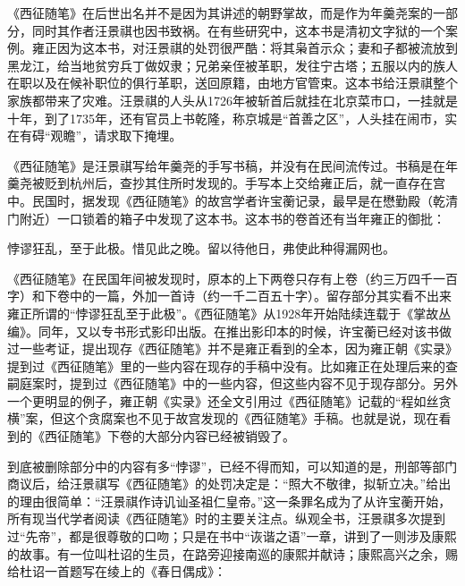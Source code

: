 
《西征随笔》在后世出名并不是因为其讲述的朝野掌故，而是作为年羹尧案的一部分，同时其作者汪景祺也因书致祸。在有些研究中，这本书是清初文字狱的一个案例。雍正因为这本书，对汪景祺的处罚很严酷：将其枭首示众；妻和子都被流放到黑龙江，给当地贫穷兵丁做奴隶；兄弟亲侄被革职，发往宁古塔；五服以内的族人在职以及在候补职位的俱行革职，送回原籍，由地方官管束。这本书给汪景祺整个家族都带来了灾难。汪景祺的人头从1726年被斩首后就挂在北京菜市口，一挂就是十年，到了1735年，还有官员上书乾隆，称京城是“首善之区”，人头挂在闹市，实在有碍“观瞻”，请求取下掩埋。



《西征随笔》是汪景祺写给年羹尧的手写书稿，并没有在民间流传过。书稿是在年羹尧被贬到杭州后，查抄其住所时发现的。手写本上交给雍正后，就一直存在宫中。民国时，据发现《西征随笔》的故宫学者许宝蘅记录，最早是在懋勤殿（乾清门附近）一口锁着的箱子中发现了这本书。这本书的卷首还有当年雍正的御批：



\begin{bookquote}悖谬狂乱，至于此极。惜见此之晚。留以待他日，弗使此种得漏网也。\end{bookquote}


《西征随笔》在民国年间被发现时，原本的上下两卷只存有上卷（约三万四千一百字）和下卷中的一篇，外加一首诗（约一千二百五十字）。留存部分其实看不出来雍正所谓的“悖谬狂乱至于此极”。《西征随笔》从1928年开始陆续连载于《掌故丛编》。同年，又以专书形式影印出版。在推出影印本的时候，许宝蘅已经对该书做过一些考证，提出现存《西征随笔》并不是雍正看到的全本，因为雍正朝《实录》提到过《西征随笔》里的一些内容在现存的手稿中没有。比如雍正在处理后来的查嗣庭案时，提到过《西征随笔》中的一些内容，但这些内容不见于现存部分。另外一个更明显的例子，雍正朝《实录》还全文引用过《西征随笔》记载的“程如丝贪横”案，但这个贪腐案也不见于故宫发现的《西征随笔》手稿。也就是说，现在看到的《西征随笔》下卷的大部分内容已经被销毁了。



到底被删除部分中的内容有多“悖谬”，已经不得而知，可以知道的是，刑部等部门商议后，给汪景祺写《西征随笔》的处罚决定是：“照大不敬律，拟斩立决。”给出的理由很简单：“汪景祺作诗讥讪圣祖仁皇帝。”这一条罪名成为了从许宝蘅开始，所有现当代学者阅读《西征随笔》时的主要关注点。纵观全书，汪景祺多次提到过“先帝”，都是很尊敬的口吻；只是在书中“诙谐之语”一章，讲到了一则涉及康熙的故事。有一位叫杜诏的生员，在路旁迎接南巡的康熙并献诗；康熙高兴之余，赐给杜诏一首题写在绫上的《春日偶成》：


